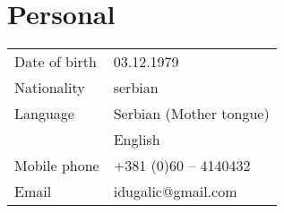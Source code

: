 \section*{Personal}
\begin{longtable}{@{}p{6cm}p{10cm}}
Date of birth 	& 03.12.1979\\
Nationality 	& serbian\\
Language 		& Serbian (Mother tongue)\\
				& English\\
Mobile phone	& +381 (0)60 – 4140432\\
Email			& idugalic@gmail.com
\end{longtable}

